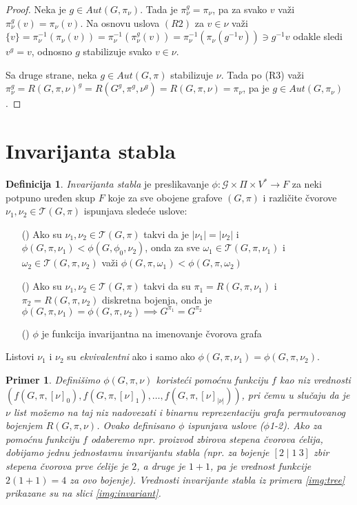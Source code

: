 \documentclass[12pt,oneside]{memoir}
\newtheorem{example}{Primer}
\theoremstyle{definition}
\newtheorem*{definition}{Definicija}
\begin{document}
  \begin{proof}
	  Neka je $g \in Aut(G, \pi_\nu)$. Tada je $\pi_\nu^g = \pi_\nu$, pa za
	  svako $v$ važi $\pi_\nu^g(v) = \pi_\nu(v)$. Na osnovu uslova $(R2)$ za $v
	  \in \nu$ važi $\{v\} = \pi_\nu^{-1}(\pi_\nu(v)) =
	  \pi_\nu^{-1}(\pi_\nu^g(v)) = \pi_\nu^{-1}(\pi_\nu(g^{-1}v)) \ni g^{-1}v$
	  odakle sledi $v^g = v$, odnosno $g$ stabilizuje svako $v \in \nu$.

	  Sa druge strane, neka $g \in Aut(G, \pi)$ stabilizuje $\nu$. Tada po (R3)
	  važi $\pi_\nu^g = R(G, \pi, \nu)^g = R(G^g, \pi^g, \nu^g) = R(G, \pi,
	  \nu) = \pi_\nu$, pa je $g \in Aut(G, \pi_\nu)$.
  \end{proof}

 \section{Invarijanta stabla}

  \begin{definition}
	  \emph{Invarijanta stabla} je preslikavanje $\phi : \mathcal{G} \times \Pi
	  \times V^* \to F$ za neki potpuno uređen skup $F$ koje za sve obojene
	  grafove $(G, \pi)$ i različite čvorove $\nu_1, \nu_2 \in \mathcal{T}(G,
	  \pi)$ ispunjava sledeće uslove:

	  \begin{itemize}
		  \item[(\phi1)] Ako su $\nu_1, \nu_2 \in \mathcal{T}(G, \pi)$ takvi
			  da je $|\nu_1|=|\nu_2|$ i $\phi(G, \pi, \nu_1) < \phi(G,
			  \phi_0, \nu_2)$, onda za sve $\omega_1 \in \mathcal{T}(G, \pi,
			  \nu_1)$ i $\omega_2 \in \mathcal{T}(G, \pi, \nu_2)$ važi
			  $\phi(G, \pi, \omega_1) < \phi(G, \pi, \omega_2)$
		  \item[(\phi2)] Ako su $\nu_1, \nu_2 \in \mathcal{T}(G, \pi)$ takvi
			  da su $\pi_1 = R(G, \pi, \nu_1)$ i $\pi_2 = R(G, \pi, \nu_2)$
			  diskretna bojenja, onda je $\phi(G, \pi, \nu_1) = \phi(G,
			  \pi, \nu_2) \implies G^{\pi_1} = G^{\pi_2}$
		  \item[(\phi3)] $\phi$ je funkcija invarijantna na imenovanje čvorova
			  grafa
	  \end{itemize}

	  Listovi $\nu_1$ i $\nu_2$ su \emph{ekvivalentni} ako i samo ako $\phi(G,
	  \pi, \nu_1) = \phi(G, \pi, \nu_2)$.
  \end{definition}

  \begin{example}
	  Definišimo $\phi(G, \pi, \nu)$ koristeći pomoćnu funkciju $f$ kao niz
	  vrednosti $(f(G, \pi, [\nu]_0), f(G, \pi, [\nu]_1), \dots, f(G, \pi,
	  [\nu]_{|\nu|}))$, pri čemu u slučaju da je $\nu$ list možemo na taj niz
	  nadovezati i binarnu reprezentaciju grafa permutovanog bojenjem $R(G,
	  \pi, \nu)$. Ovako definisano $\phi$ ispunjava uslove ($\phi$1-2). Ako za
	  pomoćnu funkciju $f$ odaberemo npr. proizvod zbirova stepena čvorova
	  ćelija, dobijamo jednu jednostavnu invarijantu stabla (npr. za bojenje
	  $[2 \mid 1\ 3]$ zbir stepena čvorova prve ćelije je $2$, a druge je $1 +
	  1$, pa je vrednost funkcije $2(1+1)=4$ za ovo bojenje). Vrednosti
	  invarijante stabla iz primera \ref{img:tree} prikazane su na slici
	  \ref{img:invariant}.
  \end{example}
\end{document}
